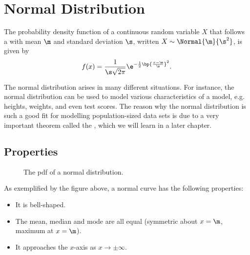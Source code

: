 \section{Normal Distribution}

\begin{definition}
    The probability density function of a continuous random variable $X$ that follows a  with mean $\m$ and standard deviation $\s$, written $X \sim \Normal{\m}{\s^2}$, is given by \[f(x) = \frac1{\s \sqrt{2\pi}} \e^{-\frac12 \bp{\frac{x-\m}{\s}}^2}.\]
\end{definition}

The normal distribution arises in many different situations. For instance, the normal distribution can be used to model various characteristics of a model, e.g. heights, weights, and even test scores. The reason why the normal distribution is such a good fit for modelling population-sized data sets is due to a very important theorem called the , which we will learn in a later chapter.

\subsection{Properties}

\begin{figure}[H]
    \centering
    \caption{The pdf of a normal distribution.}
\end{figure}

As exemplified by the figure above, a normal curve has the following properties:
\begin{itemize}
    \item It is bell-shaped.
    \item The mean, median and mode are all equal (symmetric about $x = \m$, maximum at $x = \m$).
    \item It approaches the $x$-axis as $x \to \pm \infty$.
\end{itemize}

